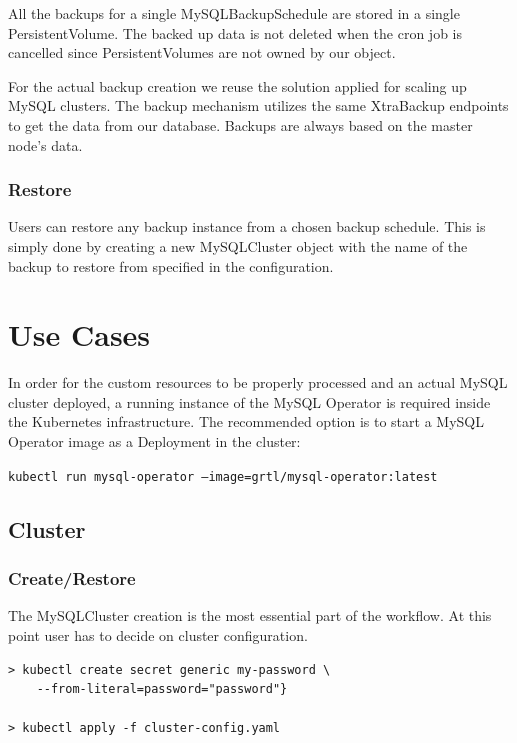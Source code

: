 All the backups for a single MySQLBackupSchedule are stored in a single 
PersistentVolume. The backed up data is not deleted when the cron job is 
cancelled since PersistentVolumes are not owned by our object.

For the actual backup creation we reuse the solution applied for scaling 
up MySQL clusters. The backup mechanism utilizes the same XtraBackup endpoints 
to get the data from our database. Backups are always based on the master 
node’s data.


\subsubsection*{Restore}
Users can restore any backup instance from a chosen backup schedule. This is simply done by creating
a new MySQLCluster object with the name of the backup to restore from specified in the
configuration.

\section{Use Cases}
In order for the custom resources to be properly processed and an actual MySQL cluster deployed, a
running instance of the MySQL Operator is required inside the Kubernetes infrastructure. The
recommended option is to start a MySQL Operator image as a Deployment in the cluster:

\texttt{kubectl run mysql-operator --image=grtl/mysql-operator:latest}

\subsection{Cluster}
\subsubsection*{Create/Restore}

The MySQLCluster creation is the most essential part of the 
workflow. At this point user has to decide on cluster configuration.

\begin{lstlisting}
> kubectl create secret generic my-password \
	--from-literal=password="password"}

> kubectl apply -f cluster-config.yaml
\end{lstlisting}

